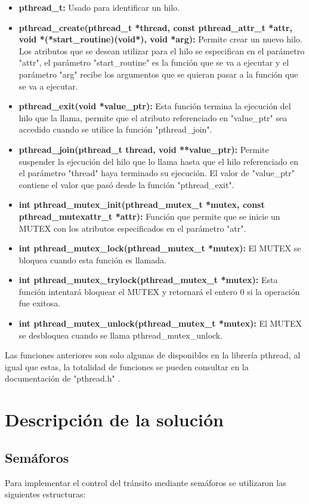 \documentclass[16pt,a4papper]{article}
\begin{document}
	\begin{itemize}
		\item \textbf{pthread\_t:} Usado para identificar un hilo.
		\item \textbf{pthread\_create(pthread\_t *thread, const pthread\_attr\_t *attr,
			void *(*start\_routine)(void*), void *arg):} Permite crear un nuevo hilo. Los atributos que se desean utilizar para el hilo se especifican en el parámetro "attr", el parámetro "start\_routine" es la función que se va a ejecutar y el parámetro "arg" recibe los argumentos que se quieran pasar a la función que se va a ejecutar.
		\item \textbf{pthread\_exit(void *value\_ptr):} Esta función termina la ejecución del hilo que la llama, permite que el atributo referenciado en "value\_ptr" sea accedido cuando se utilice la función "pthread\_join".
		\item \textbf{pthread\_join(pthread\_t thread, void **value\_ptr):} Permite suspender la ejecución del hilo que lo llama hasta que el hilo referenciado en el parámetro "thread" haya terminado su ejecución. El valor de "value\_ptr" contiene el valor que pasó desde la función "pthread\_exit".
		\item \textbf{int pthread\_mutex\_init(pthread\_mutex\_t *mutex, const pthread\_mutexattr\_t *attr):} Función que permite que se inicie un MUTEX con los atributos especificados en el parámetro "atr".
		\item \textbf{int pthread\_mutex\_lock(pthread\_mutex\_t *mutex):} El MUTEX se bloquea cuando esta función es llamada.
		\item \textbf{int pthread\_mutex\_trylock(pthread\_mutex\_t *mutex):} Esta función intentará bloquear el MUTEX y retornará el entero 0 si la operación fue exitosa.
		\item \textbf{int pthread\_mutex\_unlock(pthread\_mutex\_t *mutex):} El MUTEX se desbloquea cuando se llama pthread\_mutex\_unlock.	
	\end{itemize}

	Las funciones anteriores son solo algunas de disponibles en la librería pthread, al igual que estas, la totalidad de funciones se pueden consultar en la documentación de "pthread.h" \cite{Pthread_documentation}. 

	\newpage
	\section{Descripción de la solución}
	
	\subsection{Semáforos}
	Para implementar el control del tránsito mediante semáforos se utilizaron las siguientes estructuras:
	
\end{document}
